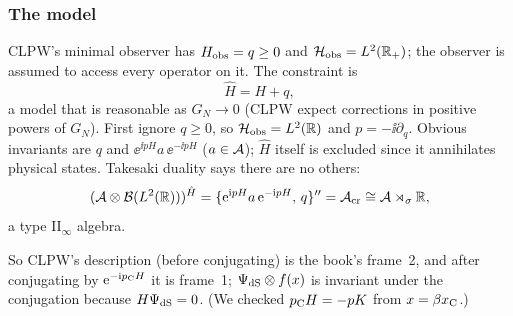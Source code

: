 \subsubsection{The model}
CLPW's minimal observer has $H_{\rm obs}=q\ge0$ and $\mathcal{H}_{\rm obs}=L^2(\mathbb{R}_+)$; the observer is assumed to access every operator on it. The constraint is
\begin{equation}
\hat H=H+q,
\end{equation}
a model that is reasonable as $G_N\to0$ (CLPW expect corrections in positive powers of $G_N$).
First ignore $q\ge0$, so $\mathcal{H}_{\rm obs}=L^2(\mathbb{R})$ and $p=-\ii\partial_q$. Obvious invariants are $q$ and $\ee^{\ii pH}a\,\ee^{-\ii pH}$ ($a\in\mathcal{A}$); $\hat H$ itself is excluded since it annihilates physical states. Takesaki duality says there are no others:
\begin{equation}
(\mathcal{A}\otimes\mathcal{B}(L^2(\mathbb{R})))^{\hat H}=\{\mathrm{e}^{\mathrm{i} pH}a\,\mathrm{e}^{-\mathrm{i} pH},\,q\}''=\mathcal{A}_{\rm cr}\cong\mathcal{A}\rtimes_\sigma\mathbb{R},
\end{equation}
a type II$_\infty$ algebra.

\begin{table}[h]
\centering
{}
\end{table}
So CLPW's description (before conjugating) is the book's frame~2, and after conjugating by $\mathrm{e}^{-\mathrm{i} p_{\rm C}H}$ it is frame~1; $\Psi_{\rm dS}\otimes f(x)$ is invariant under the conjugation because $H\Psi_{\rm dS}=0$. (We checked $p_{\rm C}H=-pK$ from $x=\beta x_{\rm C}$.)

